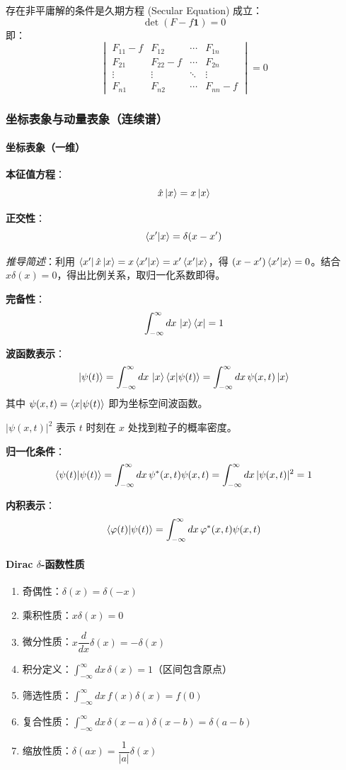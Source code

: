 \documentclass[12pt,a4paper]{article}
\begin{document}
存在非平庸解的条件是久期方程 (Secular Equation) 成立：
\[
\det(F-f\mathbf{1})=0
\]
即：
\[
\begin{vmatrix}
F_{11}-f & F_{12} & \cdots & F_{1n}\\
F_{21} & F_{22}-f & \cdots & F_{2n}\\
\vdots & \vdots & \ddots & \vdots\\
F_{n1} & F_{n2} & \cdots & F_{nn}-f
\end{vmatrix}=0
\]

\subsubsection{坐标表象与动量表象（连续谱）}

\paragraph{坐标表象（一维）}

\textbf{本征值方程}：
\[
\hat{x}\ket{x}=x\ket{x}
\]

\textbf{正交性}：
\[
\braket{x'|x}=\delta(x-x')
\]

\textit{推导简述}：利用 $\bra{x'}\hat{x}\ket{x}=x\braket{x'|x}=x'\braket{x'|x}$，得 $(x-x')\braket{x'|x}=0$。结合 $x\delta(x)=0$，得出比例关系，取归一化系数即得。

\textbf{完备性}：
\[
\int_{-\infty}^{\infty}dx\,\ket{x}\bra{x}=1
\]

\textbf{波函数表示}：
\[
\ket{\psi(t)}=\int_{-\infty}^{\infty}dx\,\ket{x}\braket{x|\psi(t)}=\int_{-\infty}^{\infty}dx\,\psi(x,t)\ket{x}
\]
其中 $\psi(x,t)=\braket{x|\psi(t)}$ 即为坐标空间波函数。

$|\psi(x,t)|^2$ 表示 $t$ 时刻在 $x$ 处找到粒子的概率密度。

\textbf{归一化条件}：
\[
\braket{\psi(t)|\psi(t)}=\int_{-\infty}^{\infty}dx\,\psi^*(x,t)\psi(x,t)=\int_{-\infty}^{\infty}dx\,|\psi(x,t)|^2=1
\]

\textbf{内积表示}：
\[
\braket{\varphi(t)|\psi(t)}=\int_{-\infty}^{\infty}dx\,\varphi^*(x,t)\psi(x,t)
\]

\paragraph{\texorpdfstring{Dirac $\delta$-函数性质}{Dirac delta-函数性质}}

\begin{enumerate}
    \item 奇偶性：$\delta(x)=\delta(-x)$
    \item 乘积性质：$x\delta(x)=0$
    \item 微分性质：$x\dfrac{d}{dx}\delta(x)=-\delta(x)$
    \item 积分定义：$\int_{-\infty}^{\infty}dx\,\delta(x)=1$（区间包含原点）
    \item 筛选性质：$\int_{-\infty}^{\infty}dx\,f(x)\delta(x)=f(0)$
    \item 复合性质：$\int_{-\infty}^{\infty}dx\,\delta(x-a)\delta(x-b)=\delta(a-b)$
    \item 缩放性质：$\delta(ax)=\dfrac{1}{|a|}\delta(x)$
\end{enumerate}
\end{document}
